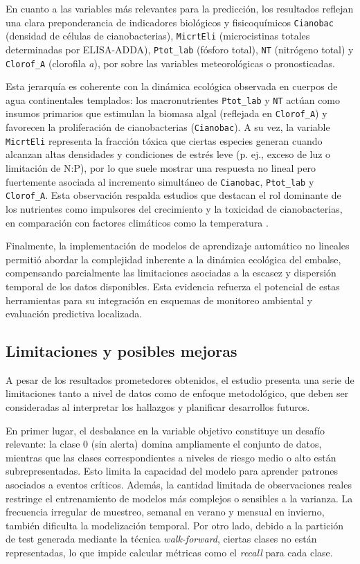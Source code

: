 \documentclass[
  11pt,
  pdftitle=TFI - Tschopp Joaquín S.,
  pdfauthor=Tschopp Joaquín S.,
  pdfcreator=LaTeX with hyperref,
]{report}  %
\begin{document}
En cuanto a las variables más relevantes para la predicción, los resultados reflejan una clara preponderancia de indicadores biológicos y fisicoquímicos \texttt{Cianobac} (densidad de células de cianobacterias), \texttt{MicrtEli} (microcistinas totales determinadas por ELISA-ADDA), \texttt{Ptot\_lab} (fósforo total), \texttt{NT} (nitrógeno total) y \texttt{Clorof\_A} (clorofila \textit{a}), por sobre las variables meteorológicas o pronosticadas.

Esta jerarquía es coherente con la dinámica ecológica observada en cuerpos de agua continentales templados: los macronutrientes \texttt{Ptot\_lab} y \texttt{NT} actúan como insumos primarios que estimulan la biomasa algal (reflejada en \texttt{Clorof\_A}) y favorecen la proliferación de cianobacterias (\texttt{Cianobac}). A su vez, la variable \texttt{MicrtEli} representa la fracción tóxica que ciertas especies generan cuando alcanzan altas densidades y condiciones de estrés leve (p. ej., exceso de luz o limitación de N:P), por lo que suele mostrar una respuesta no lineal pero fuertemente asociada al incremento simultáneo de \texttt{Cianobac}, \texttt{Ptot\_lab} y \texttt{Clorof\_A}. Esta observación respalda estudios que destacan el rol dominante de los nutrientes como impulsores del crecimiento y la toxicidad de cianobacterias, en comparación con factores climáticos como la temperatura \citep{Rigosi2014}.

Finalmente, la implementación de modelos de aprendizaje automático no lineales permitió abordar la complejidad inherente a la dinámica ecológica del embalse, compensando parcialmente las limitaciones asociadas a la escasez y dispersión temporal de los datos disponibles. Esta evidencia refuerza el potencial de estas herramientas para su integración en esquemas de monitoreo ambiental y evaluación predictiva localizada.

\subsection{Limitaciones y posibles mejoras}

A pesar de los resultados prometedores obtenidos, el estudio presenta una serie de limitaciones tanto a nivel de datos como de enfoque metodológico, que deben ser consideradas al interpretar los hallazgos y planificar desarrollos futuros.

En primer lugar, el desbalance en la variable objetivo constituye un desafío relevante: la clase 0 (sin alerta) domina ampliamente el conjunto de datos, mientras que las clases correspondientes a niveles de riesgo medio o alto están subrepresentadas. Esto limita la capacidad del modelo para aprender patrones asociados a eventos críticos. Además, la cantidad limitada de observaciones reales restringe el entrenamiento de modelos más complejos o sensibles a la varianza. La frecuencia irregular de muestreo, semanal en verano y mensual en invierno, también dificulta la modelización temporal. Por otro lado, debido a la partición de test generada mediante la técnica \textit{walk-forward}, ciertas clases no están representadas, lo que impide calcular métricas como el \textit{recall} para cada clase.
\end{document}
